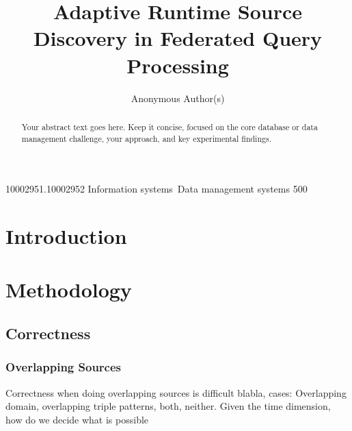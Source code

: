 \documentclass[sigconf,review,anonymous]{acmart}
\title{Adaptive Runtime Source Discovery in Federated Query Processing}
\author{Anonymous Author(s)}
\affiliation{
  \institution{Institution Name}
  \city{City}
  \country{Country}
}
\theoremstyle{plain}
\theoremstyle{definition}
\theoremstyle{remark}
\begin{document}
\begin{abstract}
Your abstract text goes here. Keep it concise, focused on the core database or data management challenge, your approach, and key experimental findings.
\end{abstract}

\begin{CCSXML}

   
       10002951.10002952
       Information systems~Data management systems
       500
   
 
\end{CCSXML}



\maketitle

\section{Introduction}



\section{Methodology}











\subsection{Correctness}

\subsubsection{Overlapping Sources}
\label{sec:overlap}
Correctness when doing overlapping sources is difficult blabla, cases: Overlapping domain,
overlapping triple patterns, both, neither.
Given the time dimension, how do we decide what is possible
\end{document}
